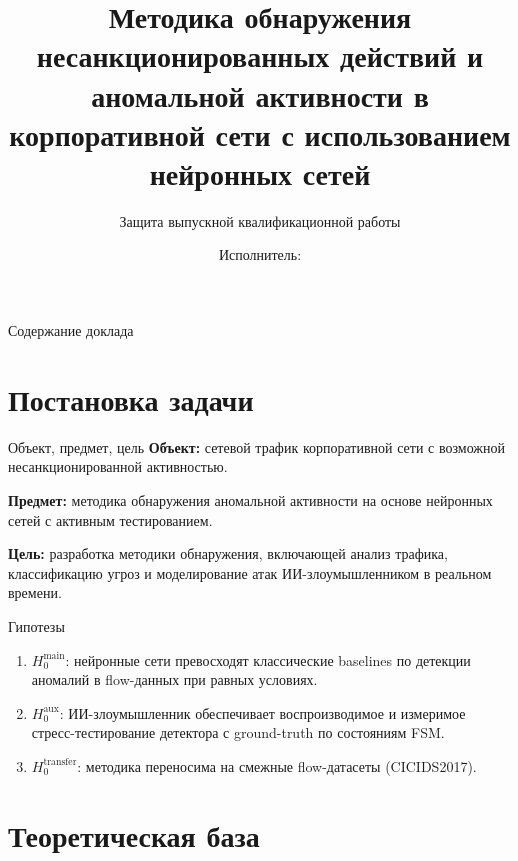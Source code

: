 \documentclass[14pt, aspectratio=169]{beamer}
\title[Методика обнаружения\ldots]{Методика обнаружения несанкционированных
действий и аномальной активности в корпоративной сети с использованием
нейронных сетей}
\subtitle{Защита выпускной квалификационной работы}
\author{Исполнитель: \rule{4cm}{0.4pt}}
\institute{Научный руководитель: \rule{4cm}{0.4pt}}
\date{\the\year}
\begin{document}
\begin{frame}
\titlepage
\end{frame}

\begin{frame}{Содержание доклада}
\tableofcontents
\end{frame}

\section{Постановка задачи}

\begin{frame}{Объект, предмет, цель}
\textbf{Объект:} сетевой трафик корпоративной сети с возможной
несанкционированной активностью.

\textbf{Предмет:} методика обнаружения аномальной активности на
основе нейронных сетей с активным тестированием.

\textbf{Цель:} разработка методики обнаружения, включающей анализ
трафика, классификацию угроз и моделирование атак ИИ-злоумышленником
в реальном времени.
\end{frame}

\begin{frame}{Гипотезы}
\begin{enumerate}
    \item $H_0^{\text{main}}$: нейронные сети превосходят классические
    baselines по детекции аномалий в flow-данных при равных условиях.
    \item $H_0^{\text{aux}}$: ИИ-злоумышленник обеспечивает
    воспроизводимое и измеримое стресс-тестирование детектора с
    ground-truth по состояниям FSM.
    \item $H_0^{\text{transfer}}$: методика переносима на смежные
    flow-датасеты (CICIDS2017).
\end{enumerate}
\end{frame}

\section{Теоретическая база}
\end{document}
